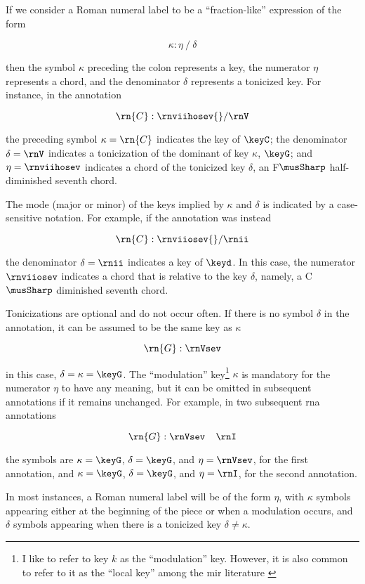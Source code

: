 
If we consider a Roman numeral label to be a
``fraction-like'' expression of the form

\begin{equation}
    \kappa : \eta \: / \: \delta
\end{equation}

then the symbol $\kappa$ preceding the colon represents a
key, the numerator $\eta$ represents a chord, and the
denominator $\delta$ represents a tonicized key. For
instance, in the annotation 

\begin{equation}
    \rn{C}:\rnviihosev{}/\rnV
\end{equation}

the preceding symbol $\kappa=\rn{C}$ indicates the key of
$\keyC$; the denominator $\delta = \rnV$ indicates a
tonicization of the dominant of key $\kappa$, $\keyG$; and
$\eta=\rnviihosev$ indicates a chord of the tonicized key
$\delta$, an F$\musSharp$ half-diminished seventh chord.

The mode (major or minor) of the keys implied by $\kappa$
and $\delta$ is indicated by a case-sensitive notation. For
example, if the annotation was instead

\begin{equation}
    \rn{C}:\rnviiosev{}/\rnii
\end{equation}

the denominator $\delta=\rnii$ indicates a key of $\keyd$.
In this case, the numerator $\rnviiosev$ indicates a chord
that is relative to the key $\delta$, namely, a C$\musSharp$
diminished seventh chord.

Tonicizations are optional and do not occur often. If there
is no symbol $\delta$ in the annotation, it can be assumed
to be the same key as $\kappa$

\begin{equation}
    \rn{G}:\rnVsev
\end{equation}

in this case, $\delta = \kappa = \keyG$. The ``modulation''
key\footnote{I like to refer to key $k$ as the
``modulation'' key. However, it is also common to refer to
it as the ``local key'' among the \gls{mir} literature
\parencite{napoleslopez2020local}} $\kappa$ is mandatory for
the numerator $\eta$ to have any meaning, but it can be
omitted in subsequent annotations if it remains unchanged.
For example, in two subsequent \gls{rna} annotations

\begin{equation}
    \rn{G}:\rnVsev \;\;\;\; \rnI
\end{equation}

the symbols are $\kappa=\keyG$, $\delta=\keyG$, and
$\eta=\rnVsev$, for the first annotation, and
$\kappa=\keyG$, $\delta=\keyG$, and $\eta=\rnI$, for the
second annotation.

In most instances, a Roman numeral label will be of the form
$\eta$, with $\kappa$ symbols appearing either at the
beginning of the piece or when a modulation occurs, and
$\delta$ symbols appearing when there is a tonicized key
$\delta \neq \kappa$.
